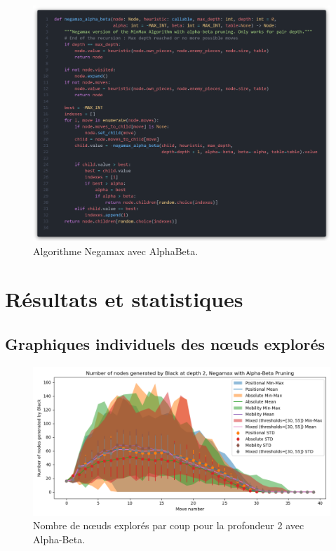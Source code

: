 \begin{figure}[H]
    \centering
    \includegraphics[width=1\textwidth]{ressources/nega-a-b.png}
    \caption{Algorithme Negamax avec AlphaBeta.}
    \label{fig:negamax-a-b}
\end{figure}


\chapter{Résultats et statistiques}
\section{Graphiques individuels des nœuds explorés}
\label{app:node_explored}

\begin{figure}[H]
    \centering
    \includegraphics[width=1\textwidth]{ressources/Number of nodes generated by Black_depth_2_Negamax with Alpha-Beta Pruning.png}
    \caption{Nombre de nœuds explorés par coup pour la profondeur 2 avec Alpha-Beta.}
    \label{fig:node_explored_alpha_beta}
\end{figure}


